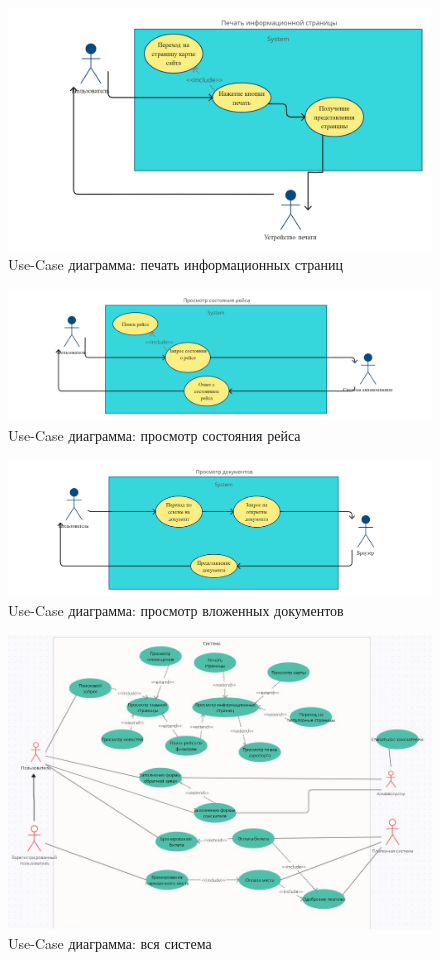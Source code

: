 \begin{figure}
      \includegraphics[width=16cm]{4-actions/Print.jpg}
      \centering
      \caption{Use-Case диаграмма: печать информационных страниц}
\end{figure}

\begin{figure}
      \includegraphics[width=16cm]{4-actions/Flight-state.jpg}
      \centering
      \caption{Use-Case диаграмма: просмотр состояния рейса}
\end{figure}

\begin{figure}
      \includegraphics[width=16cm]{4-actions/Documents.jpg}
      \centering
      \caption{Use-Case диаграмма: просмотр вложенных документов}
\end{figure}

\begin{figure}
      \includegraphics[width=16cm]{4-actions/use-case.jpg}
      \centering
      \caption{Use-Case диаграмма: вся система}
\end{figure}

